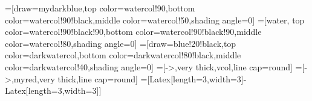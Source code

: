 \tikzset{>=latex}
\contourlength{1.1pt}

=[draw=mydarkblue,top color=watercol!90,bottom color=watercol!90!black,middle color=watercol!50,shading angle=0]
=[water,
  top color=watercol!90!black!90,bottom color=watercol!90!black!90,middle color=watercol!80,shading angle=0]
=[draw=blue!20!black,top color=darkwatercol,bottom color=darkwatercol!80!black,middle color=darkwatercol!40,shading angle=0]
=[->,very thick,vcol,line cap=round]
=[->,myred,very thick,line cap=round]
=[{Latex[length=3,width=3]}-{Latex[length=3,width=3]}]







